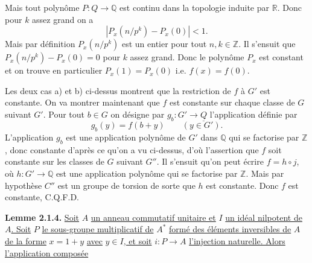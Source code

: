 
Mais tout polynôme $P:Q\to\mathbb Q$ est continu dans la topologie induite par $\mathbb R$. Donc pour $k$ assez grand on a
\[
|P_x(n/p^k)-P_x(0)|<1.
\]
Mais par définition $P_x(n/p^k)$ est un entier pour tout $n,k\in\mathbb Z$. Il s'ensuit que $P_x(n/p^k)-P_x(0)=0$ pour $k$ assez grand. Donc le polynôme $P_x$ est constant et on trouve en particulier $P_x(1)=P_x(0)$ i.e. $f(x)=f(0)$.

Les deux cas a) et b) ci-dessus montrent que la restriction de $f$ à $G'$ est constante. On va montrer maintenant que $f$ est constante sur chaque classe de $G$ suivant $G'$. Pour tout $b\in G$ on désigne par $g_b:G'\to\underline{Q}$ l'application définie par
\[
g_b(y)=f(b+y)\qquad(y\in G').
\]
L'application $g_b$ est une application polynôme de $G'$ dans $\mathbb Q$ qui se factorise par $\mathbb Z$, donc constante d'après ce qu'on a vu ci-dessus, d'où l'assertion que $f$ soit constante sur les classes de $G$ suivant $G''$. Il s'ensuit qu'on peut écrire $f=h\circ j$, où $h:G'\to\mathbb Q$ est une application polynôme qui se factorise par $\mathbb Z$. Mais par hypothèse $C''$ est un groupe de torsion de sorte que $h$ est constante. Donc $f$ est constante, C.Q.F.D.

\textbf{Lemme 2.1.4.} \uline{Soit} $A$ \uline{un anneau commutatif unitaire et} $I$ \uline{un idéal nilpotent de} $A$\uline{. Soit} $P$ \uline{le sous-groupe multiplicatif de} $A^*$ \uline{formé des éléments inversibles de} $A$ \uline{de la forme} $x=1+y$ \uline{avec} $y\in I$\uline{, et soit} $i:P\to A$ \uline{l'injection naturelle. Alors l'application composée}
